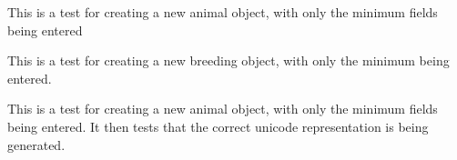 \documentclass[letterpaper,10pt,english]{sphinxmanual}
\begin{document}
\begin{fulllineitems}
\begin{fulllineitems}
\label{api:animal.tests.BreedingModelTests.test_create_animal_minimal}
This is a test for creating a new animal object, with only the minimum fields being entered

\end{fulllineitems}


\begin{fulllineitems}
\label{api:animal.tests.BreedingModelTests.test_create_breeding_minimal}
This is a test for creating a new breeding object, with only the minimum being entered.

\end{fulllineitems}


\begin{fulllineitems}
\label{api:animal.tests.BreedingModelTests.test_unicode}
This is a test for creating a new animal object, with only the minimum fields being entered.  It then tests that the correct unicode representation is being generated.

\end{fulllineitems}


\end{fulllineitems}

\end{document}

